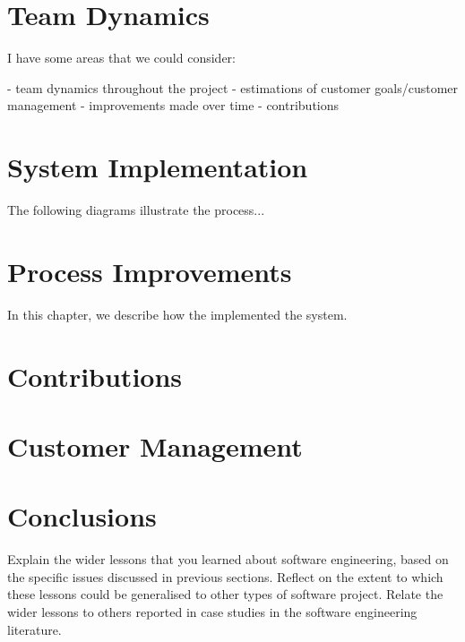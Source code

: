 \documentclass{l3proj}
\begin{document}

\section{Team Dynamics}


 I have some areas that we could consider:

  - team dynamics throughout the project
  - estimations of customer goals/customer management
  - improvements made over time
  - contributions





\section{System Implementation}
\label{design}

The following diagrams illustrate the
process...

\section{Process Improvements}
\label{managing}

In this chapter, we describe how the implemented the system.

\section{Contributions}



\section{Customer Management}
\label{sec:managing}


\section{Conclusions}

Explain the wider lessons that you learned about software engineering,
based on the specific issues discussed in previous sections.  Reflect
on the extent to which these lessons could be generalised to other
types of software project.  Relate the wider lessons to others
reported in case studies in the software engineering literature.



\end{document}
